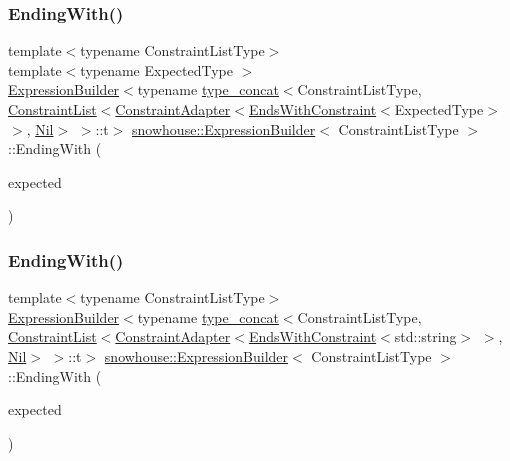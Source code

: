 \subsubsection{\texorpdfstring{EndingWith()}{EndingWith()}\hspace{0.1cm}{\footnotesize\ttfamily [1/2]}}
{\footnotesize\ttfamily template$<$typename Constraint\+List\+Type$>$ \\
template$<$typename Expected\+Type $>$ \\
\mbox{\hyperlink{structsnowhouse_1_1ExpressionBuilder}{Expression\+Builder}}$<$typename \mbox{\hyperlink{structsnowhouse_1_1type__concat}{type\+\_\+concat}}$<$Constraint\+List\+Type, \mbox{\hyperlink{structsnowhouse_1_1ConstraintList}{Constraint\+List}}$<$\mbox{\hyperlink{structsnowhouse_1_1ConstraintAdapter}{Constraint\+Adapter}}$<$\mbox{\hyperlink{structsnowhouse_1_1EndsWithConstraint}{Ends\+With\+Constraint}}$<$Expected\+Type$>$ $>$, \mbox{\hyperlink{structsnowhouse_1_1Nil}{Nil}}$>$ $>$\+::t$>$ \mbox{\hyperlink{structsnowhouse_1_1ExpressionBuilder}{snowhouse\+::\+Expression\+Builder}}$<$ Constraint\+List\+Type $>$\+::Ending\+With (\begin{DoxyParamCaption}\item[{const Expected\+Type \&}]{expected }\end{DoxyParamCaption})\hspace{0.3cm}{\ttfamily [inline]}}

\mbox{\label{structsnowhouse_1_1ExpressionBuilder_aee6bfa047a82f09500faed6cc5faedf3}} 
\subsubsection{\texorpdfstring{EndingWith()}{EndingWith()}\hspace{0.1cm}{\footnotesize\ttfamily [2/2]}}
{\footnotesize\ttfamily template$<$typename Constraint\+List\+Type$>$ \\
\mbox{\hyperlink{structsnowhouse_1_1ExpressionBuilder}{Expression\+Builder}}$<$typename \mbox{\hyperlink{structsnowhouse_1_1type__concat}{type\+\_\+concat}}$<$Constraint\+List\+Type, \mbox{\hyperlink{structsnowhouse_1_1ConstraintList}{Constraint\+List}}$<$\mbox{\hyperlink{structsnowhouse_1_1ConstraintAdapter}{Constraint\+Adapter}}$<$\mbox{\hyperlink{structsnowhouse_1_1EndsWithConstraint}{Ends\+With\+Constraint}}$<$std\+::string$>$ $>$, \mbox{\hyperlink{structsnowhouse_1_1Nil}{Nil}}$>$ $>$\+::t$>$ \mbox{\hyperlink{structsnowhouse_1_1ExpressionBuilder}{snowhouse\+::\+Expression\+Builder}}$<$ Constraint\+List\+Type $>$\+::Ending\+With (\begin{DoxyParamCaption}\item[{const char $\ast$}]{expected }\end{DoxyParamCaption})\hspace{0.3cm}{\ttfamily [inline]}}

